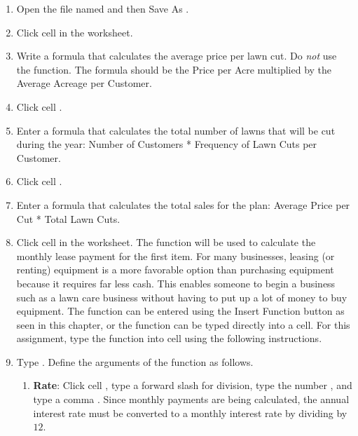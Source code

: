\begin{enumerate}
	\item Open the file named  and then Save As .
	
	\item Click cell  in the  worksheet.

	\item Write a formula that calculates the average price per lawn cut. Do \textit{not} use the  function. The formula should be the Price per Acre multiplied by the Average Acreage per Customer.
	
	\item Click cell .
	
	\item Enter a formula that calculates the total number of lawns that will be cut during the year: Number of Customers * Frequency of Lawn Cuts per Customer.
	
	\item Click cell .
	
	\item Enter a formula that calculates the total sales for the plan: Average Price per Cut * Total Lawn Cuts.
	
	\item Click cell  in the  worksheet. The  function will be used to calculate the monthly lease payment for the first item. For many businesses, leasing (or renting) equipment is a more favorable option than purchasing equipment because it requires far less cash. This enables someone to begin a business such as a lawn care business without having to put up a lot of money to buy equipment. The  function can be entered using the Insert Function button as seen in this chapter, or the  function can be typed directly into a cell. For this assignment, type the function into cell  using the following instructions.
	
	\item Type . Define the arguments of the function as follows.

	\begin{enumerate}
		\item \textbf{Rate}: Click cell , type a forward slash \fmtTyping{/} for division, type the number , and type a comma \fmtTyping{,}. Since monthly payments are being calculated, the annual interest rate must be converted to a monthly interest rate by dividing by $ 12 $.
		

\end{enumerate}
\end{enumerate}
